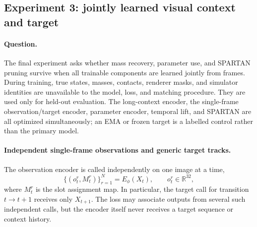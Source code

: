 \subsection{Experiment 3: jointly learned visual context and target}
\label{sec:experiments:fully-visual}

\paragraph{Question.}
The final experiment asks whether mass recovery, parameter use, and SPARTAN pruning survive when
all trainable components are learned jointly from frames.  During training, true states, masses,
contacts, renderer masks, and simulator identities are unavailable to the model, loss, and
matching procedure.  They are used only for held-out evaluation.  The long-context encoder, the
single-frame observation/target encoder, parameter encoder, temporal lift, and SPARTAN are all
optimized simultaneously; an EMA or frozen target is a labelled control rather than the primary
model.

\paragraph{Independent single-frame observations and generic target tracks.}
The observation encoder is called independently on one image at a time,
\begin{equation}
    \{(o_t^r,M_t^r)\}_{r=1}^{N}=E_\phi(X_t),
    \qquad
    o_t^r\in\mathbb{R}^{32},
    \label{eq:single-frame-encoder}
\end{equation}
where $M_t^r$ is the slot assignment map.  In particular, the target call for transition
$t\rightarrow t+1$ receives only $X_{t+1}$.  The loss may associate outputs from several such
independent calls, but the encoder itself never receives a target sequence or context history.

